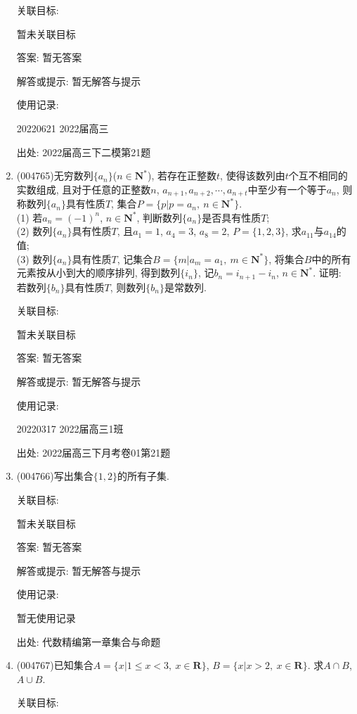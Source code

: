 \documentclass[10pt,a4paper]{article}
\begin{document}
\begin{enumerate}[1.]
关联目标:

暂未关联目标

答案: 暂无答案

解答或提示: 暂无解答与提示

使用记录:

20220621	2022届高三			


出处: 2022届高三下二模第21题
\item { (004765)}无穷数列$\{a_n\}$($n\in \mathbf{N}^*$), 若存在正整数$t$, 使得该数列由$t$个互不相同的实数组成, 且对于任意的正整数$n$, $a_{n+1},a_{n+2},\cdots,a_{n+t}$中至少有一个等于$a_n$, 则称数列$\{a_n\}$具有性质$T$, 集合$P=\{p|p=a_n, \ n\in \mathbf{N}^*\}$.\\
(1) 若$a_n=(-1)^n$, $n\in \mathbf{N}^*$, 判断数列$\{a_n\}$是否具有性质$T$;\\
(2) 数列$\{a_n\}$具有性质$T$, 且$a_1=1$, $a_4=3$, $a_8=2$, $P=\{1,2,3\}$, 求$a_{11}$与$a_{14}$的值;\\
(3) 数列$\{a_n\}$具有性质$T$, 记集合$B=\{m|a_m=a_1, \ m\in \mathbf{N}^*\}$, 将集合$B$中的所有元素按从小到大的顺序排列, 得到数列$\{i_n\}$, 记$b_n=i_{n+1}-i_n$, $n\in \mathbf{N}^*$. 证明: 若数列$\{b_n\}$具有性质$T$, 则数列$\{b_n\}$是常数列.


关联目标:

暂未关联目标

答案: 暂无答案

解答或提示: 暂无解答与提示

使用记录:

20220317	2022届高三1班			


出处: 2022届高三下月考卷01第21题
\item { (004766)}写出集合$\{1,2\}$的所有子集.


关联目标:

暂未关联目标

答案: 暂无答案

解答或提示: 暂无解答与提示

使用记录:

暂无使用记录


出处: 代数精编第一章集合与命题
\item { (004767)}已知集合$A=\{x|1 \le x<3,\ x\in \mathbf{R}\}$, $B=\{x|x>2,\ x\in \mathbf{R}\}$. 求$A\cap B$, $A\cup B$.


关联目标:


\end{enumerate}
\end{document}
